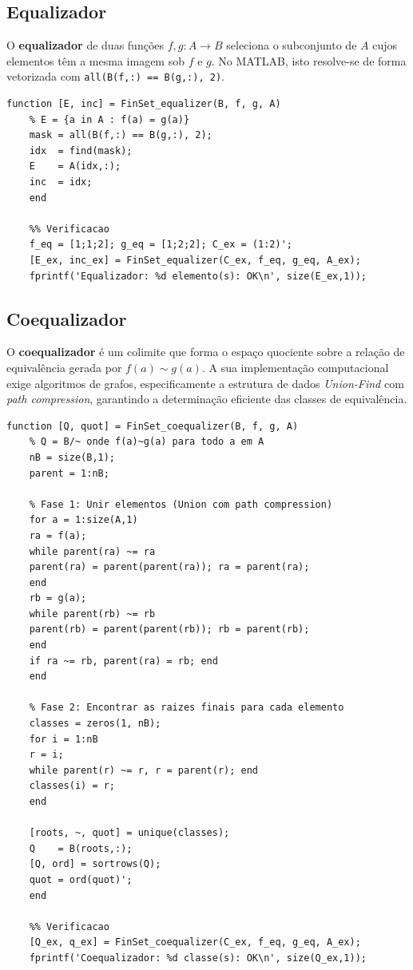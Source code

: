 \subsection{Equalizador}

O \textbf{equalizador} de duas funções $f, g: A \to B$ seleciona
o subconjunto de $A$ cujos elementos têm a mesma imagem sob $f$
e $g$. No MATLAB, isto resolve-se de forma vetorizada com
\texttt{all(B(f,:) == B(g,:), 2)}.

\begin{lstlisting}[style=matlab, caption={Equalizador em FinSet}]
	function [E, inc] = FinSet_equalizer(B, f, g, A)
	% E = {a in A : f(a) = g(a)}
	mask = all(B(f,:) == B(g,:), 2);
	idx  = find(mask);
	E    = A(idx,:);
	inc  = idx;
	end
	
	%% Verificacao
	f_eq = [1;1;2]; g_eq = [1;2;2]; C_ex = (1:2)';
	[E_ex, inc_ex] = FinSet_equalizer(C_ex, f_eq, g_eq, A_ex);
	fprintf('Equalizador: %d elemento(s): OK\n', size(E_ex,1));
\end{lstlisting}

\subsection{Coequalizador}

O \textbf{coequalizador} é um colimite que forma o espaço
quociente sobre a relação de equivalência gerada por
$f(a) \sim g(a)$. A sua implementação computacional exige
algoritmos de grafos, especificamente a estrutura de dados
\textit{Union-Find} com \textit{path compression}, garantindo
a determinação eficiente das classes de equivalência.

\begin{lstlisting}[style=matlab, caption={Coequalizador em FinSet com Union-Find e path compression}]
	function [Q, quot] = FinSet_coequalizer(B, f, g, A)
	% Q = B/~ onde f(a)~g(a) para todo a em A
	nB = size(B,1);
	parent = 1:nB;
	
	% Fase 1: Unir elementos (Union com path compression)
	for a = 1:size(A,1)
	ra = f(a);
	while parent(ra) ~= ra
	parent(ra) = parent(parent(ra)); ra = parent(ra);
	end
	rb = g(a);
	while parent(rb) ~= rb
	parent(rb) = parent(parent(rb)); rb = parent(rb);
	end
	if ra ~= rb, parent(ra) = rb; end
	end
	
	% Fase 2: Encontrar as raizes finais para cada elemento
	classes = zeros(1, nB);
	for i = 1:nB
	r = i;
	while parent(r) ~= r, r = parent(r); end
	classes(i) = r;
	end
	
	[roots, ~, quot] = unique(classes);
	Q    = B(roots,:);
	[Q, ord] = sortrows(Q);
	quot = ord(quot)';
	end
	
	%% Verificacao
	[Q_ex, q_ex] = FinSet_coequalizer(C_ex, f_eq, g_eq, A_ex);
	fprintf('Coequalizador: %d classe(s): OK\n', size(Q_ex,1));
\end{lstlisting}

